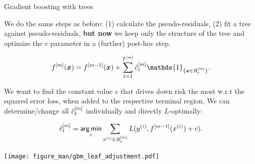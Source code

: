\begin{vbframe}{Gradient boosting with trees}

\framebreak
\begin{footnotesize}
We do the same steps as before: (1) calculate the pseudo-residuals, (2) fit a tree against pseudo-residuals, \textbf{but now} we keep only the structure of the tree and optimize the $c$ parameter in a (further) post-hoc step.

$$
\fm(\xv) = \fmd(\xv) +  \sum_{t=1}^{\Tm} \ctmt \mathds{1}_{\{\xv \in \Rtm\}}. 
$$

We want to find the constant value $c$ that drives down risk the most w.r.t the squared error loss,
when added to the respective terminal region.
We can determine/change all $\tilde{c}_t^{[m]}$ individually and directly $L$-optimally:



$$ \tilde{c}_t^{[m]} = \mathop{\sf arg\,min}_{c} \sum_{x^{(i)} \in R_{t}^{[m]}} L(y^{(i)}, f^{[m-1]}(x^{(i)}) + c). $$

\vspace{-0.5cm}

\begin{center}

\texttt{[image: figure\_man/gbm\_leaf\_adjustment.pdf]}

\end{center}

\end{footnotesize}

\framebreak




\end{vbframe}



